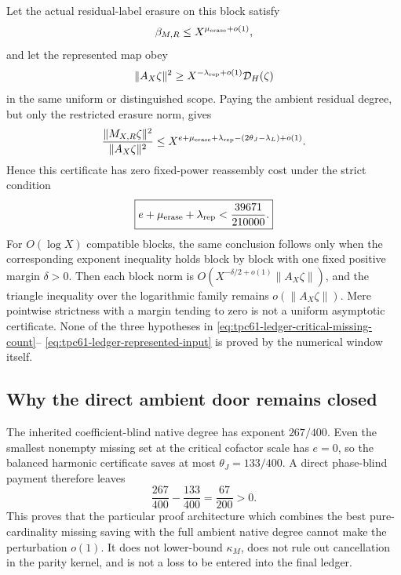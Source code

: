 Let the actual residual-label erasure on this block satisfy
\begin{equation}
 \beta_{M,R}\le X^{\mu_{\rm erase}+o(1)},
 \label{eq:tpc61-ledger-erasure-input}
\end{equation}
and let the represented map obey
\begin{equation}
 \|A_X\zeta\|^2
 \ge X^{-\lambda_{\rm rep}+o(1)}\mathcal D_H(\zeta)
 \label{eq:tpc61-ledger-represented-input}
\end{equation}
in the same uniform or distinguished scope.  Paying the ambient residual
degree, but only the restricted erasure norm, gives
\begin{equation}
 \frac{\|M_{X,R}\zeta\|^2}{\|A_X\zeta\|^2}
 \le
 X^{e+\mu_{\rm erase}+\lambda_{\rm rep}
      -(2\theta_J-\lambda_L)+o(1)}.
 \label{eq:tpc61-ledger-residual-product}
\end{equation}
Hence this certificate has zero fixed-power reassembly cost under the strict
condition
\begin{equation}
 \boxed{
 e+\mu_{\rm erase}+\lambda_{\rm rep}
 <\frac{39671}{210000}.}
 \label{eq:tpc61-ledger-residual-door}
\end{equation}
For \(O(\log X)\) compatible blocks, the same conclusion follows only when
the corresponding exponent inequality holds block by block with one fixed
positive margin \(\delta>0\).  Then each block norm is
\(O(X^{-\delta/2+o(1)}\|A_X\zeta\|)\), and the triangle inequality over
the logarithmic family remains \(o(\|A_X\zeta\|)\).  Mere pointwise
strictness with a margin tending to zero is not a uniform asymptotic
certificate.  None of the three hypotheses in
\eqref{eq:tpc61-ledger-critical-missing-count}--%
\eqref{eq:tpc61-ledger-represented-input} is proved by the numerical window
itself.

\subsection{Why the direct ambient door remains closed}

The inherited coefficient-blind native degree has exponent \(267/400\).
Even the smallest nonempty missing set at the critical cofactor scale has
\(e=0\), so the balanced harmonic certificate saves at most
\(\theta_J=133/400\).  A direct phase-blind payment therefore leaves
\begin{equation}
 \boxed{
 \frac{267}{400}-\frac{133}{400}
 =\frac{67}{200}>0.}
 \label{eq:tpc61-ledger-direct-native-gap}
\end{equation}
This proves that the particular proof architecture which combines the best
pure-cardinality missing saving with the full ambient native degree cannot
make the perturbation \(o(1)\).  It does not lower-bound \(\kappa_M\), does
not rule out cancellation in the parity kernel, and is not a loss to be
entered into the final ledger.


